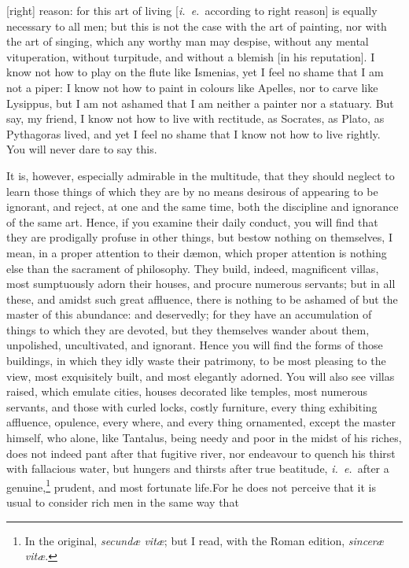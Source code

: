 \documentclass{article}
\begin{document}
[right] reason: for this art of living [\textit{i.~e.}~according to right
reason] is equally necessary to all men; but this is not the case with the art
of painting, nor with the art of singing, which any worthy man may despise,
without any mental vituperation, without turpitude, and without a blemish [in
his reputation]. I know not how to play on the flute like Ismenias, yet I feel
no shame that I am not a piper: I know not how to paint in colours like
Apelles, nor to carve like Lysippus, but I am not ashamed that I am neither a
painter nor a statuary. But say, my friend, I know not how to live with
rectitude, as Socrates, as Plato, as Pythagoras lived, and yet I feel no shame
that I know not how to live rightly. You will never dare to say this.

It is, however, especially admirable in the multitude, that they should neglect
to learn those things of which they are by no means desirous of appearing to be
ignorant, and reject, at one and the same time, both the discipline and
ignorance of the same art. Hence, if you examine their daily conduct, you will
find that they are prodigally profuse in other things, but bestow nothing on
themselves, I mean, in a proper attention to their d{\ae}mon, which proper
attention is nothing else than the sacrament of philosophy. They build, indeed,
magnificent villas, most sumptuously adorn their houses, and procure numerous
servants; but in all these, and amidst such great affluence, there is nothing
to be ashamed of but the master of this abundance: and deservedly; for they
have an accumulation of things to which they are devoted, but they themselves
wander about them, unpolished, uncultivated, and ignorant. Hence you will find
the forms of those buildings, in which they idly waste their patrimony, to be
most pleasing to the view, most exquisitely built, and most elegantly adorned.
You will also see villas raised, which emulate cities, houses decorated like
temples, most numerous servants, and those with curled locks, costly furniture,
every thing exhibiting affluence, opulence, every where, and every thing
ornamented, except the master himself, who alone, like Tantalus, being needy
and poor in the midst of his riches, does not indeed pant after that fugitive
river, nor endeavour to quench his thirst with fallacious water, but hungers
and thirsts after true beatitude, \textit{i.~e.}~after a genuine,\footnote{In
the original, \textit{secund{\ae} vit{\ae}}; but I read, with the Roman
edition, \textit{sincer{\ae} vit{\ae}}.} prudent, and most fortunate life.For
he does not perceive that it is usual to consider rich men in the same way that
\end{document}
